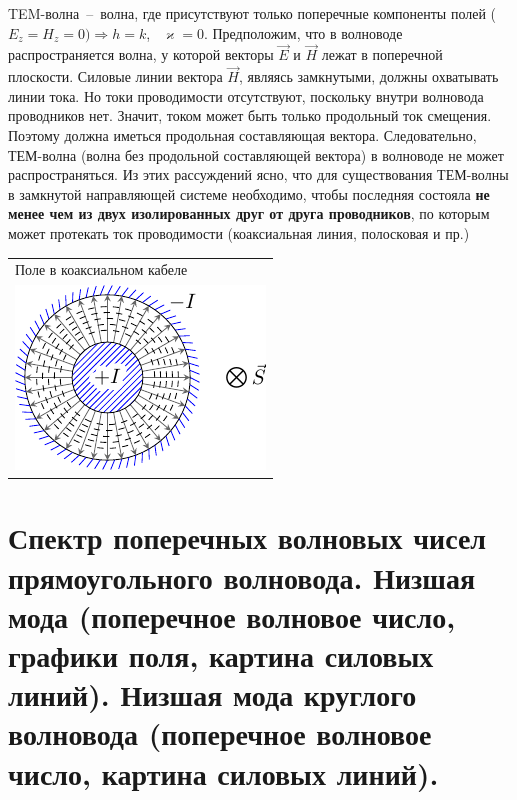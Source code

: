 \begin{multicols*}{2}
		TEM-волна~--~волна, где присутствуют только поперечные компоненты полей ($E_z = H_z = 0) \Rightarrow h = k$,~ $\varkappa = 0$. Предположим, что в волноводе распространяется волна, у которой векторы $\vec{E}$ и $\vec{H}$ лежат в поперечной плоскости. Силовые линии вектора $\vec{H}$, являясь замкнутыми, должны охватывать линии тока. Но токи проводимости отсутствуют, поскольку внутри волновода проводников нет. Значит, током может быть только продольный ток смещения. Поэтому должна иметься продольная составляющая вектора. Следовательно, ТЕМ-волна (волна без продольной составляющей вектора) в волноводе не может распространяться. Из этих рассуждений ясно, что для существования ТЕМ-волны в замкнутой направляющей системе необходимо, чтобы последняя состояла \textbf{не менее чем из двух изолированных друг от друга проводников}, по которым может протекать ток проводимости (коаксиальная линия, полосковая и пр.)\\
		\begin{tabular}{l}
			{Поле в коаксиальном кабеле} \\
			\includegraphics[width=0.25\linewidth]{aed_imgs/lect4_ris6} \\
		\end{tabular}
		
		\section{Спектр поперечных волновых чисел прямоугольного волновода. Низшая мода (поперечное волновое число, графики поля, картина силовых линий). Низшая мода круглого волновода (поперечное волновое число, картина силовых линий).}
		

\end{multicols*}
